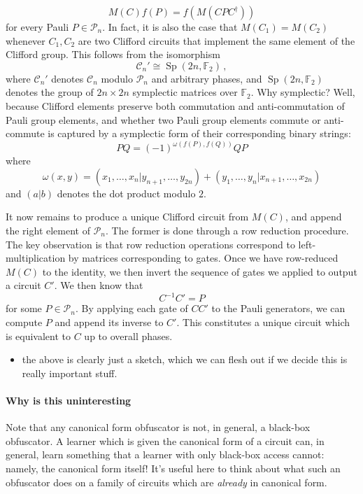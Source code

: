 \documentclass[11pt]{article}
\numberwithin{equation}{section}
\newcommand{\opn}{\operatorname}
\newcommand{\F}{\mathbb{F}}
\begin{document}
$$
M(C) f(P) = f( M (CPC^\dagger))
$$
for every Pauli $P \in \mathcal P_n$. In fact, it is also the case that $M(C_1) = M(C_2)$ whenever $C_1, C_2$ are two Clifford circuits that implement the same element of the Clifford group. This follows from the isomorphism
$$
\mathcal C_n' \cong \opn{Sp}(2n, \F_2)\,,
$$
where $\mathcal C_n'$ denotes $\mathcal C_n$ modulo $\mathcal P_n$ and arbitrary phases, and $\opn{Sp}(2n, \F_2)$ denotes the group of $2n \times 2n$ symplectic matrices over $\F_2$. Why symplectic? Well, because Clifford elements preserve both commutation and anti-commutation of Pauli group elements, and whether two Pauli group elements commute or anti-commute is captured by a symplectic form of their corresponding binary strings:
$$
PQ = (-1)^{\omega(f(P), f(Q))}QP
$$
where
$$
\omega(x, y) = (x_1, \dots, x_n | y_{n+1}, \dots, y_{2n}) + (y_1, \dots, y_n |  x_{n+1}, \dots, x_{2n})
$$
and $(a | b)$ denotes the dot product modulo $2$.

It now remains to produce a unique Clifford circuit from $M(C)$, and append the right element of $\mathcal P_n.$ The former is done through a row reduction procedure. The key observation is that row reduction operations correspond to left-multiplication by matrices corresponding to gates. Once we have row-reduced $M(C)$ to the identity, we then invert the sequence of gates we applied to output a circuit $C'$. We then know that
$$
C^{-1} C' = P
$$
for some $P \in \mathcal P_n$. By applying each gate of $CC'$ to the Pauli generators, we can compute $P$ and append its inverse to $C'$. This constitutes a unique circuit which is equivalent to $C$ up to overall phases.

\begin{itemize}
\item the above is clearly just a sketch, which we can flesh out if we decide this is really important stuff.
\end{itemize}

\paragraph{Why is this uninteresting}

Note that any canonical form obfuscator is not, in general, a black-box obfuscator. A learner which is given the canonical form of a circuit can, in general, learn something that a learner with only black-box access cannot: namely, the canonical form itself! It's useful here to think about what such an obfuscator does on a family of circuits which are \emph{already} in canonical form.
\end{document}
